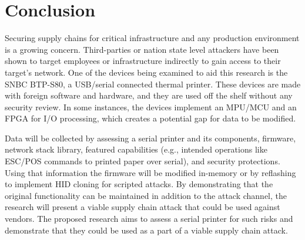 \chapter{\leavevmode Conclusion}
\label{chap:conclusion}

Securing supply chains for critical infrastructure and any production environment is a growing concern. Third-parties or nation state level attackers have been shown to target employees or infrastructure indirectly to gain access to their target's network. One of the devices being examined to aid this research is the SNBC BTP-S80, a USB/serial connected thermal printer. These devices are made with foreign software and hardware, and they are used off the shelf without any security review. In some instances, the devices implement an MPU/MCU and an FPGA for I/O processing, which creates a potential gap for data to be modified. 

Data will be collected by assessing a serial printer and its components, firmware, network stack library, featured capabilities (e.g., intended operations like ESC/POS commands to printed paper over serial), and security protections. Using that information the firmware will be modified in-memory or by reflashing to implement HID cloning for scripted attacks. By demonstrating that the original functionality can be maintained in addition to the attack channel, the research will present a viable supply chain attack that could be used against vendors. The proposed research aims to assess a serial printer for such risks and demonstrate that they could be used as a part of a viable supply chain attack.




